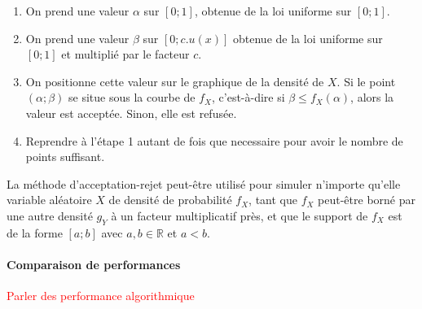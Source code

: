 \documentclass{article}
\begin{document}
\begin{enumerate}
\item On prend une valeur $\alpha$ sur $[0;1]$, obtenue de la loi uniforme sur $[0;1]$.
\item On prend une valeur $\beta$ sur $[0;c.u(x)]$ obtenue de la loi uniforme sur $[0;1]$ et multiplié par le facteur $c$.
\item On positionne cette valeur sur le graphique de la densité de $X$. Si le point $(\alpha; \beta)$ se situe sous la courbe de $f_X$, c'est-à-dire si $\beta \leq f_X(\alpha)$, alors la valeur est acceptée. Sinon, elle est refusée.
\item Reprendre à l'étape 1 autant de fois que necessaire pour avoir le nombre de points suffisant.
\end{enumerate}
\begin{center}
\end{center}
La méthode d'acceptation-rejet peut-être utilisé pour simuler n'importe qu'elle variable aléatoire $X$ de densité de probabilité $f_X$, tant que $f_X$ peut-être borné par une autre densité $g_Y$ à un facteur multiplicatif près, et que le support de $f_X$ est de la forme $[a;b]$ avec $a,b \in \mathbb{R}$ et $a < b$.
\paragraph{Comparaison de performances}
\textcolor{red}{Parler des performance algorithmique}
\end{document}
